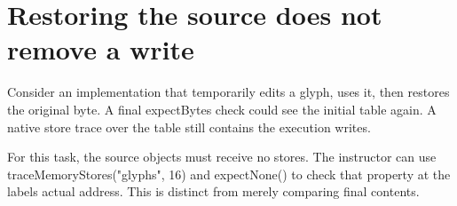 \section{Restoring the source does not remove a
  write}\label{005-seven-segment-counter-x-readonly-restoring-the-source-does-not-remove-a-write}

Consider an implementation that temporarily edits a glyph, uses it, then
restores the original byte. A final expectBytes check could see the
initial table again. A native store trace over the table still contains
the execution writes.

For this task, the source objects must receive no stores. The instructor
can use traceMemoryStores("glyphs", 16) and expectNone() to check that
property at the label\textquotesingle s actual address. This is distinct
from merely comparing final contents.
